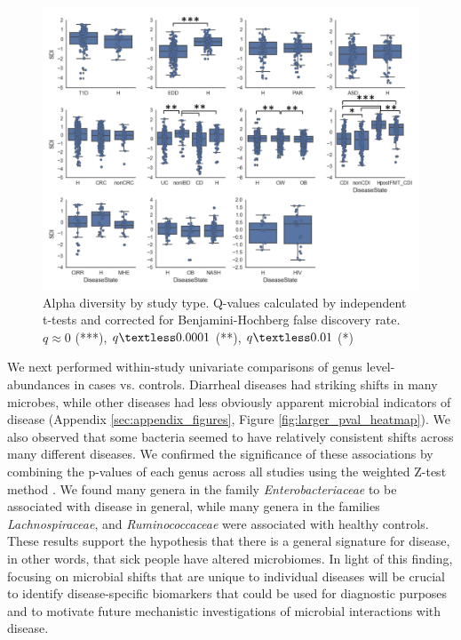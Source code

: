 \documentclass[12pt]{article}
\begin{document}
\begin{figure}
\begin{center}
	\includegraphics[scale=0.55]{alpha_diversity_by_study_type}
	\caption{Alpha diversity by study type. Q-values calculated by independent t-tests and corrected for Benjamini-Hochberg false discovery rate. $q \approx 0$ (***), $q \textless 0.0001$ (**), $q \textless 0.01$ (*)}	\label{fig:alpha}
\end{center}
\end{figure}

We next performed within-study univariate comparisons of genus level-abundances in cases vs. controls. Diarrheal 
diseases had striking shifts in many microbes, while other
diseases had less obviously apparent microbial indicators of disease (Appendix \ref{sec:appendix_figures}, Figure \ref{fig:larger_pval_heatmap}). We also observed that some bacteria
seemed to have relatively consistent shifts across many
different diseases. We confirmed the significance of these associations by combining the p-values of each genus across all studies using the weighted Z-test method \cite{zavkin-ztest-2011}.
We found many genera in the family \textit{Enterobacteriaceae} to be associated
with disease in general, while many genera in the families \textit{Lachnospiraceae}, 
and \textit{Ruminococcaceae} were associated with healthy controls.
These results support the hypothesis that
there is a general signature for disease, in other words, that sick people have 
altered microbiomes. In light of this finding, focusing on microbial shifts that 
are unique to individual diseases will be crucial to identify disease-specific biomarkers
that could be used for diagnostic purposes and to motivate future mechanistic investigations of microbial interactions with disease.
\end{document}
